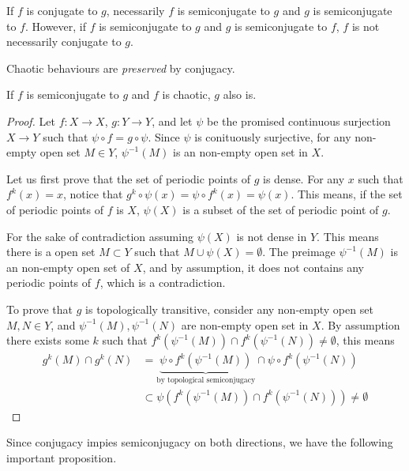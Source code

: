If $f$ is conjugate to $g$, necessarily $f$ is semiconjugate to $g$ and $g$ is semiconjugate to $f$. 
However, if $f$ is semiconjugate to $g$ and $g$ is semiconjugate to $f$, $f$ is not necessarily conjugate to $g$. 

Chaotic behaviours are \emph{preserved} by conjugacy.


\begin{thm}\label{th_semicong_chaos}
	If $f$ is semiconjugate to $g$ and $f$ is chaotic, $g$ also is.
\end{thm}

\begin{proof}
	Let $f: X \rightarrow X$, $g:  Y \rightarrow Y$, and let $\psi$ be the promised continuous surjection $X \rightarrow Y$ such that
	$\psi \circ f = g \circ \psi$. 
	Since $\psi$ is conituously surjective, for any non-empty open set $M \in Y$, $\psi^{-1}(M)$ is an non-empty open set in $X$.

	Let us first prove that the set of periodic points of $g$ is dense.
	For any $x$ such that $f^k(x) = x$, notice that $g^k \circ \psi (x) = \psi \circ f^k (x) = \psi(x)$. 
	This means, if the set of periodic points of $f$ is $X$, $\psi(X)$ is a subset of the set of periodic point of $g$.

	For the sake of contradiction assuming $\psi(X)$ is not dense in $Y$. 
	This means there is a open set $M \subset Y$ such that $M \cup \psi(X) = \emptyset$.
	The preimage $\psi^{-1}(M)$ is an non-empty open set of $X$, and by assumption, it does not contains any periodic points of $f$, which is a contradiction.

	To prove that $g$ is topologically transitive, consider any non-empty open set $M, N \in Y$, and $\psi^{-1}(M), \psi^{-1}(N)$ are non-empty open set in $X$. 
	By assumption there exists some $k$ such that $f^k(\psi^{-1}(M)) \cap f^k(\psi^{-1}(N)) \neq \emptyset$, this means 
	\begin{align*}
		g^k(M) \cap g^k(N) 
		&= \underbrace{\psi \circ f^k(\psi^{-1}(M))}_{\text{by topological semiconjugacy}} \cap \psi \circ f^k(\psi^{-1}(N)) \\
	    &\subset \psi( f^k(\psi^{-1}(M)) \cap  f^k(\psi^{-1}(N))) \neq \emptyset
	\end{align*}
\end{proof}

Since conjugacy impies semiconjugacy on both directions, we have the following important proposition.

